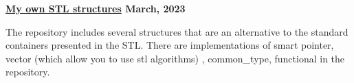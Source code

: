 \textbf{\href{https://github.com/jirol9xa/MySTL} {My own STL structures} \hfill  March, 2023} \par
\begin{itemize}
The repository includes several structures that are an alternative to the standard containers presented in the STL. There are implementations of smart pointer, vector (which allow you to use stl algorithms) , common\_type, functional   in the repository.
\end{itemize} \par
